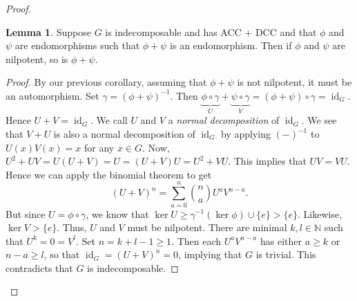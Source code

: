\documentclass[10pt,letterpaper,cm]{nupset}
\theoremstyle{definition}
\newtheorem{lemma}{Lemma}
\newcommand{\N}{\mathbb N}
\newcommand{\1}{\mathbf{1}}
\newcommand{\0}{\vec 0}
\DeclareMathOperator{\id}{id}
\begin{document}
\begin{proof}
\begin{lemma}
Suppose $G$ is indecomposable and has ACC + DCC and that $\phi$ and $\psi$ are endomorphisms such that $\phi + \psi$ is an endomorphism. Then if $\phi$ and $\psi$ are nilpotent, so is $\phi + \psi$.
\end{lemma}
\begin{proof}
By our previous corollary, assuming that $\phi + \psi$ is not nilpotent, it must be an automorphism. Set $\gamma = (\phi + \psi)^{-1}$. Then $\underbrace{\phi \circ \gamma}_U + \underbrace{\psi \circ \gamma}_V = (\phi +\psi) \circ \gamma = \id_G$. Hence $U + V = \id_G$. We call $U$ and $V$ a \textit{normal decomposition} of $\id_G$. We see that $V + U$ is also a normal decomposition of $\id_G$ by applying $(-)^{-1}$ to $U(x)V(x) =x$ for any $x \in G$.
Now, $U^2 + UV = U(U + V) = U = (U + V)U = U^2 + VU$. This implies that $UV = VU$. Hence we can apply the binomial theorem to get $$(U + V)^n = \sum_{a=0}^n{ {n}\choose {a}} U^aV^{n-a}.$$ But since $U = \phi \circ \gamma$, we know that $\ker U\geq \gamma^{-1}(\ker \phi) \cup \{e\} > \{e\}$. Likewise, $\ker V > \{e\}$. Thus, $U$ and $V$ must be nilpotent. There are minimal $k, l \in \N$ such that $U^k = 0 = V^l$. Set $n = k+l -1 \geq 1$. Then each $U^aV^{n-a}$ has either $a\geq k$ or $n-a\geq l$, so that $\id_G = (U+V)^n = 0$, implying that $G$ is trivial. This contradicts that $G$ is indecomposable.
\end{proof}


\end{proof}
\end{document}
